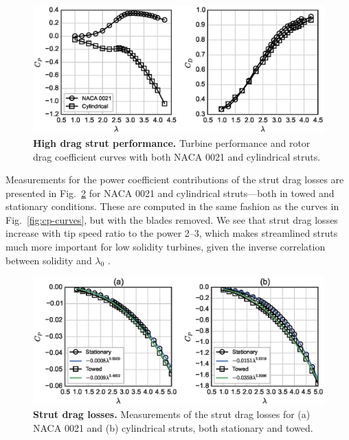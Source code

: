\documentclass[10pt,letterpaper]{article}
\begin{document}
\begin{figure}[ht!]
    \includegraphics[width=\textwidth]{figures/perf_covers.eps}
    
    \caption{{\bf High drag strut performance.} Turbine performance and rotor
        drag coefficient curves with both NACA 0021 and cylindrical struts.}
    
    \label{fig:perf-covers}
\end{figure}

Measurements for the power coefficient contributions of the strut drag losses
are presented in Fig.~\ref{fig:no-blades} for NACA 0021 and cylindrical
struts---both in towed and stationary conditions. These are computed in the same
fashion as the curves in Fig.~\ref{fig:cp-curves}, but with the blades removed.
We see that strut drag losses increase with tip speed ratio to the power 2--3,
which makes streamlined struts much more important for low solidity turbines,
given the inverse correlation between solidity and $\lambda_0$
\cite{Templin1974}.

\begin{figure}[ht!]
    \includegraphics[width=\textwidth]{figures/no_blades_all.eps}

    \caption{{\bf Strut drag losses.} Measurements of the strut drag losses for
    (a) NACA 0021 and (b) cylindrical struts, both stationary and towed.}

    \label{fig:no-blades}
\end{figure}
\end{document}
